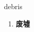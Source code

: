 
\begin{frame}
{\huge debris}
\begin{center}
\begin{enumerate}\Large
  \item \textbf{废墟}
\end{enumerate}
\end{center}
\end{frame}
